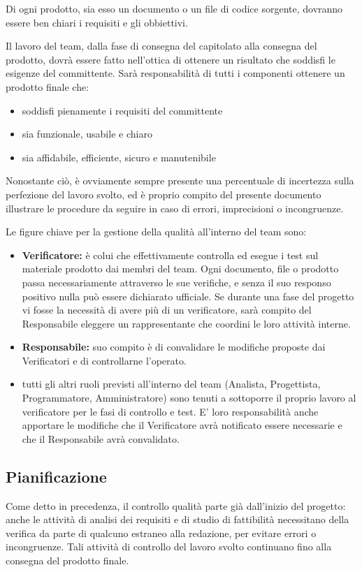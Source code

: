 \documentclass[11pt,a4paper]{article}
\begin{document}
Di ogni prodotto, sia esso un documento o un file di codice sorgente, dovranno essere ben chiari i requisiti e gli obbiettivi.

Il lavoro del team, dalla fase di consegna del capitolato alla consegna del prodotto, dovrà essere fatto nell'ottica di ottenere un risultato che soddisfi le esigenze del committente. Sarà responsabilità di tutti i componenti ottenere un prodotto finale che:
\begin{itemize}
 	\item soddisfi pienamente i requisiti del committente
 	\item sia funzionale, usabile e chiaro
	\item sia affidabile, efficiente, sicuro e manutenibile
\end{itemize}

Nonostante ciò, è ovviamente sempre presente una percentuale di incertezza sulla perfezione del lavoro svolto, ed è proprio compito del presente documento illustrare le procedure da seguire in caso di errori, imprecisioni o incongruenze.

Le figure chiave per la gestione della qualità all'interno del team sono:
\begin{itemize}
	\item \textbf{Verificatore:} è colui che effettivamente controlla ed esegue i test sul materiale prodotto dai membri del team. Ogni documento, file o prodotto passa necessariamente attraverso le sue verifiche, e senza il suo responso positivo nulla può essere dichiarato ufficiale. Se durante una fase del progetto vi fosse la necessità di avere più di un verificatore, sarà compito del Responsabile eleggere un rappresentante che coordini le loro attività interne.
	\item \textbf{Responsabile:} suo compito è di convalidare le modifiche proposte dai Verificatori e di controllarne l'operato.
	\item tutti gli altri ruoli previsti all'interno del team (Analista, Progettista, Programmatore, Amministratore) sono tenuti a sottoporre il proprio lavoro al verificatore per le fasi di controllo e test. E' loro responsabilità anche apportare le modifiche che il Verificatore avrà notificato essere necessarie e che il Responsabile avrà convalidato.
\end{itemize}
\subsection{Pianificazione}
Come detto in precedenza, il controllo qualità parte già dall'inizio del progetto: anche le attività di analisi dei requisiti e di studio di fattibilità necessitano della verifica da parte di qualcuno estraneo alla redazione, per evitare errori o incongruenze.
Tali attività di controllo del lavoro svolto continuano fino alla consegna del prodotto finale. 
\end{document}
